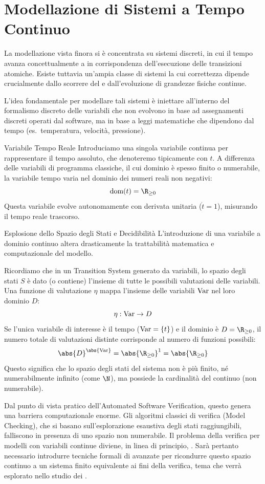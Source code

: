 \chapter{Modellazione di Sistemi a Tempo Continuo}

La modellazione vista finora si è concentrata su sistemi discreti, in cui il tempo avanza concettualmente a  in corrispondenza dell'esecuzione delle transizioni atomiche. Esiste tuttavia un'ampia classe di sistemi la cui correttezza dipende crucialmente dallo scorrere del  e dall'evoluzione di grandezze fisiche continue.

L'idea fondamentale per modellare tali sistemi è iniettare all'interno del formalismo discreto delle variabili che non evolvono in base ad assegnamenti discreti operati dal software, ma in base a leggi matematiche che dipendono dal tempo (es.\ temperatura, velocità, pressione).

\begin{definition}{Variabile Tempo Reale}
  Introduciamo una singola variabile continua per rappresentare il tempo assoluto, che denoteremo tipicamente con \(t\). A differenza delle variabili di programma classiche, il cui dominio è spesso finito o numerabile, la variabile tempo varia nel dominio dei numeri reali non negativi:
  \[ \text{dom}(t) = \R_{\ge 0} \]
  Questa variabile evolve autonomamente con derivata unitaria (\(\dot{t} = 1\)), misurando il tempo reale trascorso.
\end{definition}

\begin{observation}{Esplosione dello Spazio degli Stati e Decidibilità}
  L'introduzione di una variabile a dominio continuo altera drasticamente la trattabilità matematica e computazionale del modello.

  Ricordiamo che in un Transition System generato da variabili, lo spazio degli stati \(S\) è dato (o contiene) l'insieme di tutte le possibili valutazioni delle variabili. Una funzione di valutazione \(\eta\) mappa l'insieme delle variabili \(\operatorname{Var}\) nel loro dominio \(D\):
  \[ \eta: \operatorname{Var} \to D \]
  Se l'unica variabile di interesse è il tempo (\(\operatorname{Var} = \{t\}\)) e il dominio è \(D = \R_{\ge 0}\), il numero totale di valutazioni distinte corrisponde al numero di funzioni possibili:
  \[ \abs{D}^{\abs{\Var}} = \abs{\R_{\ge 0}}^1 = \abs{\R_{\ge 0}} \]
  Questo significa che lo spazio degli stati del sistema non è più finito, né numerabilmente infinito (come \(\N\)), ma possiede la cardinalità del continuo (non numerabile).

  Dal punto di vista pratico dell'Automated Software Verification, questo genera una barriera computazionale enorme. Gli algoritmi classici di verifica (Model Checking), che si basano sull'esplorazione esaustiva degli stati raggiungibili, falliscono in presenza di uno spazio non numerabile. Il problema della verifica per modelli con variabili continue diviene, in linea di principio, . Sarà pertanto necessario introdurre tecniche formali di  avanzate per ricondurre questo spazio continuo a un sistema finito equivalente ai fini della verifica, tema che verrà esplorato nello studio dei .
\end{observation}

